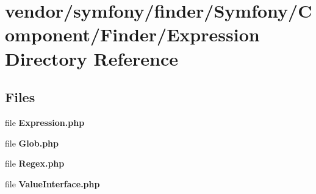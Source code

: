 \section{vendor/symfony/finder/\+Symfony/\+Component/\+Finder/\+Expression Directory Reference}
\label{dir_426973f5594f69cd3b3f9201aabaae58}
\subsection*{Files}
\begin{DoxyCompactItemize}
\item 
file {\bf Expression.\+php}
\item 
file {\bf Glob.\+php}
\item 
file {\bf Regex.\+php}
\item 
file {\bf Value\+Interface.\+php}
\end{DoxyCompactItemize}
